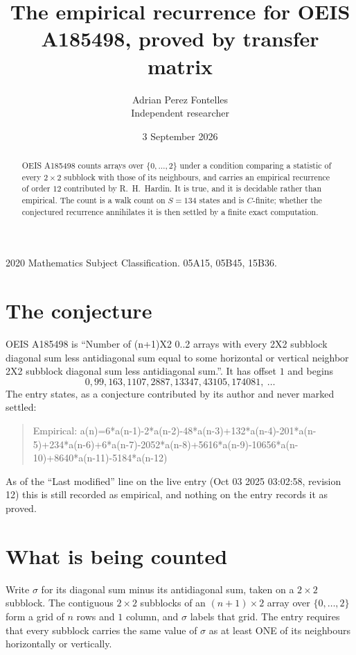 \documentclass[11pt,a4paper]{article}
\title{The empirical recurrence for OEIS A185498, proved by transfer matrix}
\author{Adrian Perez Fontelles\\ \small Independent researcher}
\date{3 September 2026}
\theoremstyle{plain}
\theoremstyle{definition}
\begin{document}
\maketitle

\begin{abstract}
OEIS A185498 counts arrays over $\{0,\dots,2\}$ under a condition comparing a statistic of
every $2\times2$ subblock with those of its neighbours, and carries an empirical recurrence
of order $12$ contributed by R.~H.~Hardin. It is true, and it is decidable rather than
empirical. The count is a walk count on $S=134$ states and is $C$-finite; whether the
conjectured recurrence annihilates it is then settled by a finite exact computation.
\end{abstract}

\noindent\small 2020 Mathematics Subject Classification. 05A15, 05B45, 15B36.\normalsize

\section{The conjecture}

OEIS A185498 is ``Number of (n+1)X2 0..2 arrays with every 2X2 subblock diagonal sum less antidiagonal sum equal to some horizontal or vertical neighbor 2X2 subblock diagonal sum less antidiagonal sum.''. It has offset $1$ and begins
\[
0, 99, 163, 1107, 2887, 13347, 43105, 174081,\ \dots
\]
The entry states, as a conjecture contributed by its author and never marked settled:
\begin{quote}
Empirical: a(n)=6*a(n-1)-2*a(n-2)-48*a(n-3)+132*a(n-4)-201*a(n-5)+234*a(n-6)+6*a(n-7)-2052*a(n-8)+5616*a(n-9)-10656*a(n-10)+8640*a(n-11)-5184*a(n-12)
\end{quote}
As of the ``Last modified'' line on the live entry (Oct 03 2025 03:02:58, revision 12) this is still
recorded as empirical, and nothing on the entry records it as proved.

\section{What is being counted}

Write $\sigma$ for its diagonal sum minus its antidiagonal sum, taken on a $2\times2$ subblock. The contiguous $2\times2$
subblocks of an $(n+1)\times2$ array over $\{0,\dots,2\}$ form a grid of $n$ rows
and $1$ column, and $\sigma$ labels that grid. The entry
requires that every subblock carries the same value of $\sigma$ as at least ONE of its neighbours horizontally or vertically.
\end{document}

